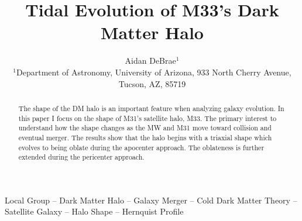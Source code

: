 \documentclass[usenatbib]{mnras}
\title{Tidal Evolution of M33’s Dark Matter Halo}
\author{
Aidan DeBrae$^{1}$
\\
$^{1}$Department of Astronomy, University of Arizona, 933 North Cherry Avenue, Tucson, AZ, 85719}
\begin{document}
\label{firstpage}
\pagerange{\pageref{firstpage}--\pageref{lastpage}}
\maketitle

\begin{abstract}
    The shape of the DM halo is an important feature when analyzing galaxy evolution. In this paper I focus on the shape of M31's satellite halo, M33. The primary interest to understand how the shape changes as the MW and M31 move toward collision and eventual merger. The results show that the halo begins with a triaxial shape which evolves to being oblate during the apocenter approach. The oblateness is further extended during the pericenter approach.  
\end{abstract}
\begin{keywords}
Local Group -- Dark Matter Halo -- Galaxy Merger -- Cold Dark Matter Theory -- Satellite Galaxy -- Halo Shape -- Hernquist Profile
\end{keywords}


\end{document}
